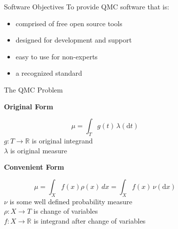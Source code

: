 \documentclass[final]{beamer}
\newcommand{\bfCenter}[1]{\centerline{\textbf{#1}}}
\newlength{\sepwid}
\newlength{\onecolwid}
\newlength{\threecolwid}
\newcommand{\dif}{\mathrm{d}}
\begin{document}
\setlength{\belowcaptionskip}{2ex}
\setlength\belowdisplayshortskip{2ex}
\begin{frame}[t]
\vspace{-2ex}
\begin{columns}[t]

\begin{column}{\sepwid}\end{column}
\begin{column}{\threecolwid}
\begin{columns}[t,totalwidth=\threecolwid]  

\begin{column}{\onecolwid}\vspace{-1in}
\begin{block}{Software Objectives}
    To provide QMC software \cite{HicEtal19} that is: 
    \begin{itemize}
        \item comprised of free open source tools
        \item designed for development and support 
        \item easy to use for non-experts
        \item a recognized standard
    \end{itemize}
\end{block}

\vspace{-2ex}
\begin{block}{The QMC Problem}
    \bfCenter{Original Form}
        \begin{equation*}
            \mu = \int_{T} g(t) \, \lambda(\dif t) 
            \label{eq:ogProblem}
        \end{equation*}
        $ g:T \rightarrow \mathbb{R}  $ is original integrand \\
        $ \lambda $ is original measure

    \vspace{2ex}
    \bfCenter{Convenient Form}
        \begin{equation*}
            \mu = \int_{X} f(x)\rho(x)\, dx = \int_{X} f(x) \, \nu( \dif x)
            \label{convForm}
        \end{equation*}
        $\nu  $ is some well defined probability measure\\
        $\rho: X \rightarrow T $ is change of variables\\
        $f: X \rightarrow \mathbb{R} $ is integrand after change of variables
        

\end{block}
\end{column}
\end{columns}
\end{column}
\end{columns}
\end{frame}
\end{document}

